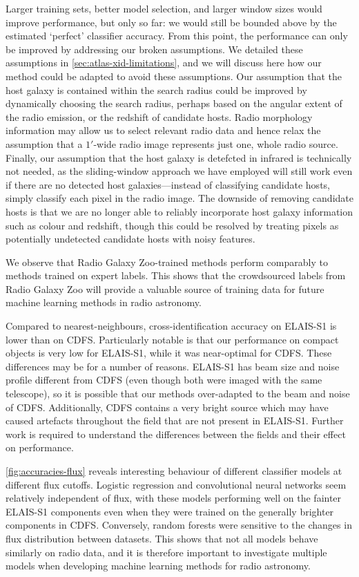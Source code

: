   Larger training sets, better model selection, and larger window sizes would
  improve performance, but only so far: we would still be bounded above by the
  estimated `perfect' classifier accuracy. From this point, the performance
  can only be improved by addressing our broken assumptions. We detailed
  these assumptions in \autoref{sec:atlas-xid-limitations}, and we will discuss here how
  {our method could be adapted to avoid these assumptions}. Our assumption that the host galaxy is contained
  within the search radius could be improved by dynamically choosing the
  search radius, perhaps based on the angular extent of the radio emission, or the
  redshift of candidate hosts. Radio morphology information may allow us to
  select relevant radio data and hence relax the assumption that a $1'$-wide
  radio image represents just one, whole radio source. Finally, our assumption
  that the host galaxy is detefcted in infrared is technically not needed, as
  the sliding-window approach we have employed will still work even if there
  are no detected host galaxies---instead of classifying candidate hosts,
  simply classify each pixel in the radio image. The downside of removing
  candidate hosts is that we are no longer able to reliably incorporate host
  galaxy information such as colour and redshift, though this could be
  resolved by treating pixels as potentially undetected candidate hosts with
  noisy features.

  We observe that Radio Galaxy Zoo-trained methods perform comparably to
  methods trained on expert labels. This shows that the crowdsourced labels
  from Radio Galaxy Zoo will provide a valuable source of training
  data for future machine learning methods in radio astronomy.

  Compared to nearest-neighbours, cross-identification accuracy on ELAIS-S1 is
  lower than on CDFS. Particularly notable is that our performance on compact
  objects is very low for ELAIS-S1, while it was near-optimal for CDFS. These
  differences may be for a number of reasons. ELAIS-S1 has beam size and noise
  profile different from CDFS (even though both were imaged with the same
  telescope), so it is possible that our methods over-adapted to the beam and
  noise of CDFS. Additionally, CDFS contains a very bright source which may
  have caused artefacts throughout the field that are not present in ELAIS-S1.
  Further work is required to understand the differences between the fields
  and their effect on performance.

  \autoref{fig:accuracies-flux} reveals interesting behaviour of different
  classifier models at different flux cutoffs. Logistic regression and
  convolutional neural networks seem relatively independent of flux, with
  these models performing well on the fainter ELAIS-S1 components even when
  they were trained on the generally brighter components in CDFS. Conversely,
  random forests were sensitive to the changes in flux distribution between
  datasets. This shows that not all models behave similarly on radio data,
  and it is therefore important to investigate multiple models when
  developing machine learning methods for radio astronomy.

